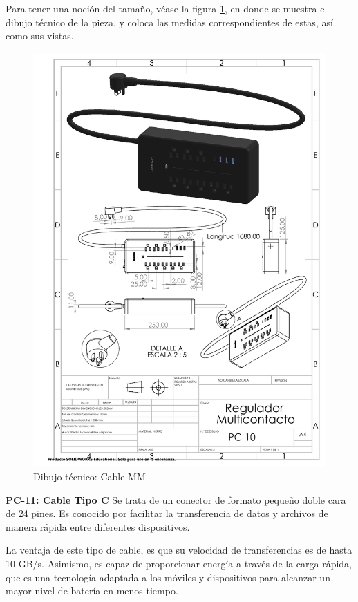     
    Para tener una noción del tamaño, véase la figura \ref{fig:multicontacto}, en donde se muestra el dibujo técnico de la pieza, y coloca las medidas correspondientes de estas, así como sus vistas.
    \begin{figure}[H]
        \centering
        \includegraphics[trim = {7mm 1mm 1mm 1mm},clip,scale=0.4]{22/Img/multicontactoDibujo.pdf}
        \caption{Dibujo técnico: Cable MM}
        \label{fig:multicontacto}
    \end{figure}
    
    \textbf{PC-11: Cable Tipo C }
    Se trata de un conector de formato pequeño doble cara de 24 pines. Es conocido por facilitar la transferencia de datos y archivos de manera rápida entre diferentes dispositivos.
    
    La ventaja de este tipo de cable, es que su velocidad de transferencias es de hasta 10 GB/s. Asimismo, es capaz de proporcionar energía a través de la carga rápida, que es una tecnología adaptada a los móviles y dispositivos para alcanzar un mayor nivel de batería en menos tiempo.
    

